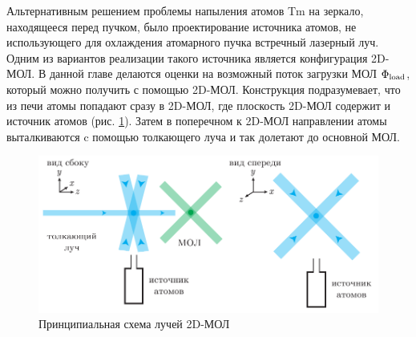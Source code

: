 

Альтернативным решением проблемы напыления атомов Tm на зеркало, находящееся перед пучком,  было проектирование источника атомов, не использующего для охлаждения атомарного пучка встречный лазерный луч. Одним из вариантов реализации такого источника является конфигурация 2D-МОЛ. В данной главе делаются оценки на возможный поток загрузки МОЛ $\Phi_{\textnormal{load}}$, который можно получить с помощью 2D-МОЛ. Конструкция подразумевает, что из печи атомы попадают сразу в 2D-МОЛ, где плоскость 2D-МОЛ содержит и источник атомов (рис. \ref{fig:2dmots}). Затем в поперечном к 2D-МОЛ направлении атомы выталкиваются c помощью толкающего луча и так долетают до основной МОЛ. 


\begin{figure}[ht]
    \centering
    \includegraphics{figs/2dmot_v2.pdf}
    \caption{Принципиальная схема лучей 2D-МОЛ}
    \label{fig:2dmots}
\end{figure}
